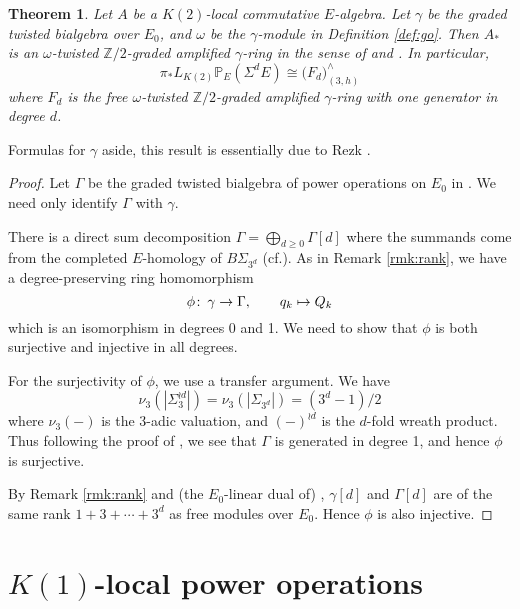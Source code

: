 \documentclass{gtpart}
\newtheorem{thm}{Theorem}
\theoremstyle{definition}
\theoremstyle{remark}
\def\co{\colon\thinspace}
\newcommand{\mb}[1]{\mathbb{#1}}
\newcommand{\cf}{cf.\thinspace}
\newcommand{\BP}{{\mb P}}
\newcommand{\BZ}{{\mb Z}}
\newcommand{\G}{\Gamma}
\newcommand{\g}{\gamma}
\begin{document}
\begin{thm}
\label{thm:gamma}
 Let $A$ be a $K(2)$-local commutative $E$-algebra.  
 Let $\g$ be the graded twisted bialgebra over $E_0$, and $\omega$ be the $\g$-module in Definition \ref{def:go}.  
 Then $A_*$ is an {\em $\omega$-twisted $\BZ/2$-graded amplified $\g$-ring} in the sense of \cite[Section 2]{cong} and \cite[2.5 and 2.6]{h2p2}.  In particular, 
 \[
  \pi_* L_{K(2)} \BP_E (\Sigma^d E) \cong \big( F_d \big)_{(3,h)}^\wedge 
 \]
 where $F_d$ is the free $\omega$-twisted $\BZ/2$-graded amplified $\g$-ring with one generator in degree $d$.  
\end{thm}
Formulas for $\g$ aside, this result is essentially due to Rezk \cite{cong, h2p2}.  
\begin{proof}
 Let $\G$ be the graded twisted bialgebra of power operations on $E_0$ in \cite[Section 6]{cong}.  
 We need only identify $\G$ with $\g$.  

 There is a direct sum decomposition $\G = \bigoplus_{d \geq 0} \G[d]$ 
 where the summands come from the completed $E$-homology of $B\Sigma_{3^d}$ (\cf \cite[6.2]{cong}).  
 As in Remark \ref{rmk:rank}, we have a degree-preserving ring homomorphism 
 \[
  \phi \co \g \to \G, \qquad q_k \mapsto Q_k 
 \]
 which is an isomorphism in degrees 0 and 1.  
 We need to show that $\phi$ is both surjective and injective in all degrees.  

 For the surjectivity of $\phi$, we use a transfer argument.  
 We have 
 \[
  \nu_3(|\Sigma_3^{\wr d}|) = \nu_3(|\Sigma_{3^d}|) = (3^d - 1) / 2 
 \]
 where $\nu_3(-)$ is the 3-adic valuation, and $(-)^{\wr d}$ is the $d$-fold wreath product.  
 Thus following the proof of \cite[Proposition 3.17]{cong}, 
 we see that $\G$ is generated in degree 1, and hence $\phi$ is surjective.  

 By Remark \ref{rmk:rank} and (the $E_0$-linear dual of) \cite[Theorem 1.1]{Str98}, 
 $\g[d]$ and $\G[d]$ are of the same rank $1 + 3 + \cdots + 3^d$ as free modules over $E_0$.  
 Hence $\phi$ is also injective.  
\end{proof}


\section{$K(1)$-local power operations}
\label{sec:K(1)}
\end{document}
